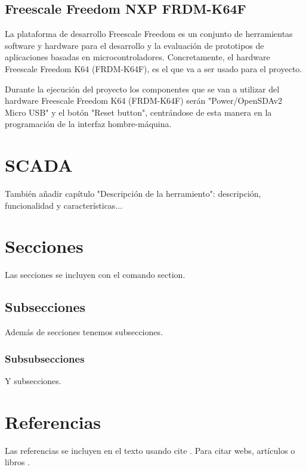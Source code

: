 \subsection{Freescale Freedom NXP FRDM-K64F}

La plataforma de desarrollo Freescale Freedom es un conjunto de herramientas software y hardware para el desarrollo y la evaluación de prototipos de aplicaciones basadas en microcontroladores. Concretamente, el hardware Freescale Freedom K64 (FRDM-K64F), es el que va a ser usado para el proyecto.


Durante la ejecución del proyecto los componentes que se van a utilizar del hardware Freescale Freedom K64 (FRDM-K64F) serán "Power/OpenSDAv2 Micro USB" y el botón "Reset button", centrándose de esta manera en la programación de la interfaz hombre-máquina.

\section{SCADA}
También añadir capítulo "Descripción de la herramiento": descripción, funcionalidad y características...

\section{Secciones}

Las secciones se incluyen con el comando section.

\subsection{Subsecciones}

Además de secciones tenemos subsecciones.

\subsubsection{Subsubsecciones}

Y subsecciones. 


\section{Referencias}

Las referencias se incluyen en el texto usando cite \cite{wiki:latex}. Para citar webs, artículos o libros \cite{koza92}.


